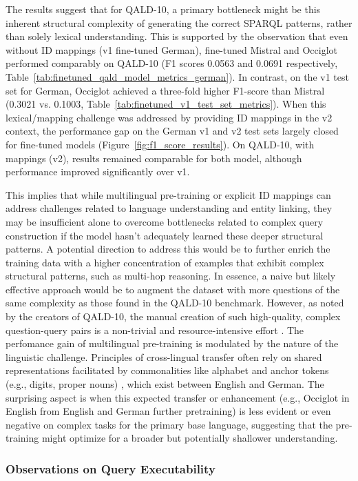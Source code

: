 The results suggest that for QALD-10, a primary bottleneck might be this inherent structural complexity of generating the correct SPARQL patterns, rather than solely lexical understanding. 
This is supported by the observation that even without ID mappings (v1 fine-tuned German), fine-tuned Mistral and Occiglot performed comparably on QALD-10 (F1 scores 0.0563 and 0.0691 respectively, Table~\ref{tab:finetuned_qald_model_metrics_german}).
In contrast, on the v1 test set for German, Occiglot achieved a three-fold higher F1-score than Mistral (0.3021 vs. 0.1003, Table~\ref{tab:finetuned_v1_test_set_metrics}). 
When this lexical/mapping challenge was addressed by providing ID mappings in the v2 context, the performance gap on the German v1 and v2 test sets largely closed for fine-tuned models (Figure~\ref{fig:f1_score_results}). 
On QALD-10, with mappings (v2), results remained comparable for both model, although performance improved significantly over v1.

This implies that while multilingual pre-training or explicit ID mappings can address challenges related to language understanding and entity linking, they may be insufficient alone to overcome bottlenecks related to complex query construction if the model hasn't adequately learned these deeper structural patterns. A potential direction to address this would be to further enrich the training data with a higher concentration of examples that exhibit complex structural patterns, such as multi-hop reasoning. In essence, a naive but likely effective approach would be to augment the dataset with more questions of the same complexity as those found in the QALD-10 benchmark. However, as noted by the creators of QALD-10, the manual creation of such high-quality, complex question-query pairs is a non-trivial and resource-intensive effort \cite{usbeck2024qald}. 
The perfomance gain of multilingual pre-training is modulated by the nature of the linguistic challenge.
Principles of cross-lingual transfer often rely on shared representations facilitated by commonalities like alphabet and anchor tokens (e.g., digits, proper nouns) \cite{conneau2019cross}, which exist between English and German.
The surprising aspect is when this expected transfer or enhancement (e.g., Occiglot in English from English and German further pretraining) is less evident or even negative on complex tasks for the primary base language, suggesting that the pre-training might optimize for a broader but potentially shallower understanding.

\subsubsection{Observations on Query Executability}

